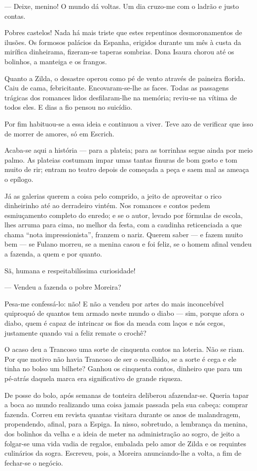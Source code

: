 --- Deixe, menino! O mundo dá voltas. Um dia cruzo-me com o ladrão e
justo contas.

Pobres castelos! Nada há mais triste que estes repentinos
desmoronamentos de ilusões. Os formosos palácios da Espanha, erigidos
durante um mês à custa da mirífica dinheirama, fizeram-se taperas
sombrias. Dona Isaura chorou até os bolinhos, a manteiga e os frangos.

Quanto a Zilda, o desastre operou como pé de vento através de paineira
florida. Caiu de cama, febricitante. Encovaram-se-lhe as faces. Todas as
passagens trágicas dos romances lidos desfilaram-lhe na memória;
reviu-se na vítima de todos eles. E dias a fio pensou no suicídio.

Por fim habituou-se a essa ideia e continuou a viver. Teve azo de
verificar que isso de morrer de amores, só em Escrich.

Acaba-se aqui a história --- para a plateia; para as torrinhas segue
ainda por meio palmo. As plateias costumam impar umas tantas finuras de
bom gosto e tom muito de rir; entram no teatro depois de começada a peça
e saem mal as ameaça o epílogo.

Já as galerias querem a coisa pelo comprido, a jeito de aproveitar o
rico dinheirinho até ao derradeiro vintém. Nos romances e contos pedem
esmiuçamento completo do enredo; e se o autor, levado por fórmulas de
escola, lhes arruma para cima, no melhor da festa, com a caudinha
reticenciada a que chama ``nota impressionista'', franzem o nariz.
Querem saber --- e fazem muito bem --- se Fulano morreu, se a menina
casou e foi feliz, se o homem afinal vendeu a fazenda, a quem e por
quanto.

Sã, humana e respeitabilíssima curiosidade!

--- Vendeu a fazenda o pobre Moreira?

Pesa-me confessá-lo: não! E não a vendeu por artes do mais inconcebível
quiproquó de quantos tem armado neste mundo o diabo --- sim, porque
afora o diabo, quem é capaz de intrincar os fios da meada com laços e
nós cegos, justamente quando vai a feliz remate o crochê?

O acaso deu a Trancoso uma sorte de cinquenta contos na loteria. Não se
riam. Por que motivo não havia Trancoso de ser o escolhido, se a sorte é
cega e ele tinha no bolso um bilhete? Ganhou os cinquenta contos,
dinheiro que para um pé-atrás daquela marca era significativo de grande
riqueza.

De posse do bolo, após semanas de tonteira deliberou afazendar-se.
Queria tapar a boca ao mundo realizando uma coisa jamais passada pela
sua cabeça: comprar fazenda. Correu em revista quantas visitara durante
os anos de malandragem, propendendo, afinal, para a Espiga. Ia nisso,
sobretudo, a lembrança da menina, dos bolinhos da velha e a ideia de
meter na administração ao sogro, de jeito a folgar-se uma vida vadia de
regalos, embalada pelo amor de Zilda e os requintes culinários da sogra.
Escreveu, pois, a Moreira anunciando-lhe a volta, a fim de fechar-se o
negócio.

